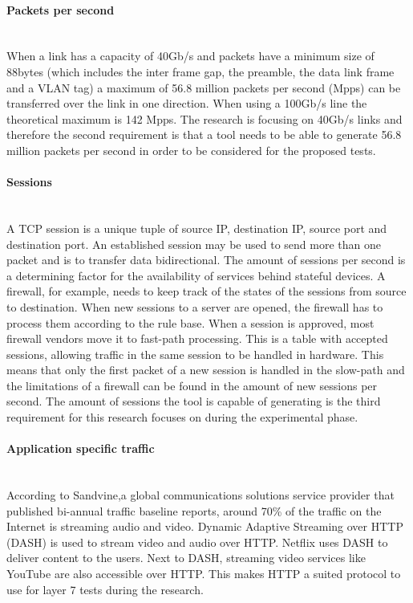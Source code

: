 \paragraph{Packets per second}\label{par:pps}\mbox{}\\
When a link has a capacity of 40Gb/s and packets have a minimum size of 88bytes (which includes the inter frame gap, the preamble, the data link frame and a VLAN tag) a maximum of 56.8 million packets per second (Mpps) can be transferred over the link in one direction. When using a 100Gb/s line the theoretical maximum is 142 Mpps.   
The research is focusing on 40Gb/s links and therefore the second requirement is that a tool needs to be able to generate 56.8 million packets per second in order to be considered for the proposed tests.

\paragraph{Sessions}\label{par:sessions}\mbox{}\\
A TCP session is a unique tuple of source IP, destination IP, source port and destination port. 
An established session may be used to send more than one packet and is to transfer data bidirectional.
The amount of sessions per second is a determining factor for the availability of services behind stateful devices. 
A firewall, for example, needs to keep track of the states of the sessions from source to destination. 
When new sessions to a server are opened, the firewall has to process them according to the rule base. 
When a session is approved, most firewall vendors move it to fast-path processing. 
This is a table with accepted sessions, allowing traffic in the same session to be handled in hardware. This means that only the first packet of a new session is handled in the slow-path and the limitations of a firewall can be found in the amount of new sessions per second.
The amount of sessions the tool is capable of generating is the third requirement for this research focuses on during the experimental phase.

\paragraph{Application specific traffic}\mbox{} \\
According to Sandvine\cite{phenomena_2017},a global communications solutions service provider that published bi-annual traffic baseline reports, around 70\% of the traffic on the Internet is streaming audio and video. 
Dynamic Adaptive Streaming over HTTP (DASH)\cite{dash} is used to stream video and audio over HTTP. 
Netflix uses DASH to deliver content to the users. 
Next to DASH, streaming video services like YouTube are also accessible over HTTP.
This makes HTTP a suited protocol to use for layer 7 tests during the research.  

